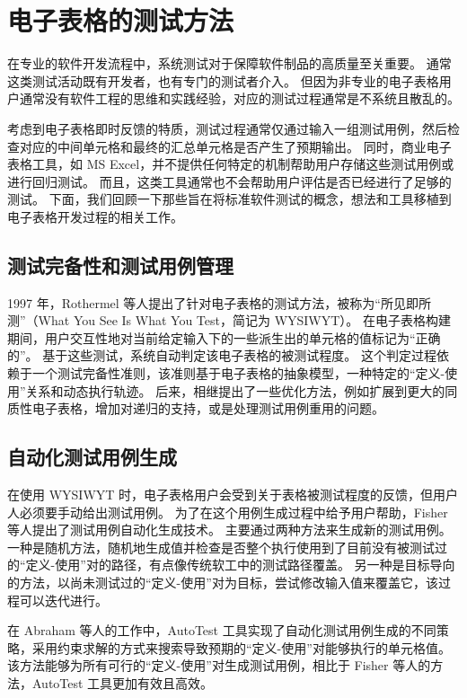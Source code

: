 \section{电子表格的测试方法}

在专业的软件开发流程中，系统测试对于保障软件制品的高质量至关重要。
通常这类测试活动既有开发者，也有专门的测试者介入。
但因为非专业的电子表格用户通常没有软件工程的思维和实践经验，对应的测试过程通常是不系统且散乱的。

考虑到电子表格即时反馈的特质，测试过程通常仅通过输入一组测试用例，然后检查对应的中间单元格和最终的汇总单元格是否产生了预期输出。
同时，商业电子表格工具，如 MS Excel，并不提供任何特定的机制帮助用户存储这些测试用例或进行回归测试。
而且，这类工具通常也不会帮助用户评估是否已经进行了足够的测试。
下面，我们回顾一下那些旨在将标准软件测试的概念，想法和工具移植到电子表格开发过程的相关工作。

\subsection{测试完备性和测试用例管理}
1997 年，Rothermel 等人\cite{rothermel1997testing,rothermel1998you,rothermel2001methodology}提出了针对电子表格的测试方法，被称为“所见即所测”（What You See Is What You Test，简记为 WYSIWYT）。
在电子表格构建期间，用户交互性地对当前给定输入下的一些派生出的单元格的值标记为“正确的”。
基于这些测试，系统自动判定该电子表格的被测试程度。
这个判定过程依赖于一个测试完备性准则，该准则基于电子表格的抽象模型，一种特定的“定义-使用”关系和动态执行轨迹。
后来，相继提出了一些优化方法，例如扩展到更大的同质性电子表格，增加对递归的支持，或是处理测试用例重用的问题\cite{burnett1999scaling,burnett2001visually,burnett2002testing,fisher2002automated,fisher2006scaling,randolph2002generalised}。

\subsection{自动化测试用例生成}
在使用 WYSIWYT 时，电子表格用户会受到关于表格被测试程度的反馈，但用户人必须要手动给出测试用例。
为了在这个用例生成过程中给予用户帮助，Fisher 等人\cite{fisher2002automated,fisher2006integrating}提出了测试用例自动化生成技术。
主要通过两种方法来生成新的测试用例。
一种是随机方法，随机地生成值并检查是否整个执行使用到了目前没有被测试过的“定义-使用”对的路径，有点像传统软工中的测试路径覆盖。
另一种是目标导向的方法，以尚未测试过的“定义-使用”对为目标，尝试修改输入值来覆盖它，该过程可以迭代进行。

在 Abraham 等人的工作\cite{abraham2006autotest}中，AutoTest 工具实现了自动化测试用例生成的不同策略，采用约束求解的方式来搜索导致预期的“定义-使用”对能够执行的单元格值。该方法能够为所有可行的“定义-使用”对生成测试用例，相比于 Fisher 等人的方法\cite{fisher2006integrating}，AutoTest 工具更加有效且高效。

